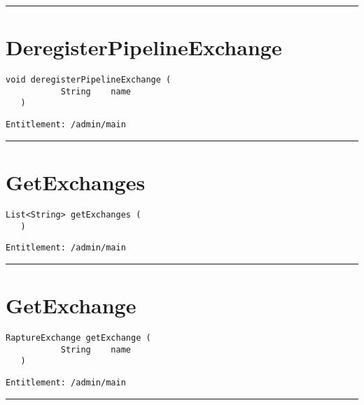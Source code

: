 \rule{12cm}{2pt}
\section{DeregisterPipelineExchange}
\label{Api:DeregisterPipelineExchange}
\begin{lstlisting}[style=nonumbers]
   void deregisterPipelineExchange (
           String    name
   )
\end{lstlisting}
\begin{Verbatim}[formatcom=\color{Maroon}]
  Entitlement: /admin/main
\end{Verbatim}



\rule{12cm}{2pt}
\section{GetExchanges}
\label{Api:GetExchanges}
\begin{lstlisting}[style=nonumbers]
   List<String> getExchanges (
   )
\end{lstlisting}
\begin{Verbatim}[formatcom=\color{Maroon}]
  Entitlement: /admin/main
\end{Verbatim}



\rule{12cm}{2pt}
\section{GetExchange}
\label{Api:GetExchange}
\begin{lstlisting}[style=nonumbers]
   RaptureExchange getExchange (
           String    name
   )
\end{lstlisting}
\begin{Verbatim}[formatcom=\color{Maroon}]
  Entitlement: /admin/main
\end{Verbatim}



\rule{12cm}{2pt}
